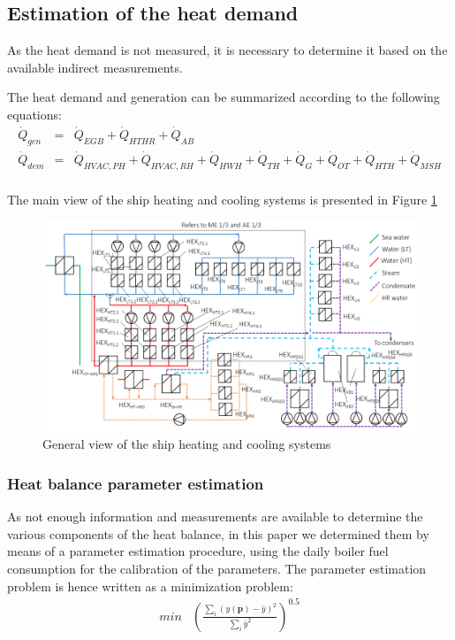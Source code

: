 \documentclass[preprint,12pt]{elsarticle}
\begin{document}
\subsection{Estimation of the heat demand} \label{sec:met:heat}

As the heat demand is not measured, it is necessary to determine it based on the available indirect measurements. 
	
The heat demand and generation can be summarized according to the following equations:
\begin{eqnarray}
\dot{Q}_{gen} & = & \dot{Q}_{EGB} + \dot{Q}_{HTHR} + \dot{Q}_{AB} \\
\dot{Q}_{dem} & = & \dot{Q}_{HVAC,PH} + \dot{Q}_{HVAC,RH} + \dot{Q}_{HWH} + \dot{Q}_{TH} + \dot{Q}_{G} + \dot{Q}_{OT} + 	\dot{Q}_{HTH} + \dot{Q}_{MSH} \\
\end{eqnarray}

The main view of the ship heating and cooling systems is presented in Figure \ref{fig:ship:general}

\begin{figure}
	\centering
	\includegraphics[width=0.999\linewidth]{Figures/Heating_cooling_systems}
	\caption{General view of the ship heating and cooling systems}
	\label{fig:ship:general}
\end{figure}

	
\subsubsection{Heat balance parameter estimation}
	
As not enough information and measurements are available to determine the various components of the heat balance, in this paper we determined them by means of a parameter estimation procedure, using the daily boiler fuel consumption for the calibration of the parameters. The parameter estimation problem is hence written as a minimization problem:
\begin{eqnarray}
min &  \left(\frac{\sum_i(y(\textbf{p})-\bar{y})^2}{\sum_i \bar{y}^2}\right)^{0.5} \\
\end{eqnarray}
	
\end{document}
